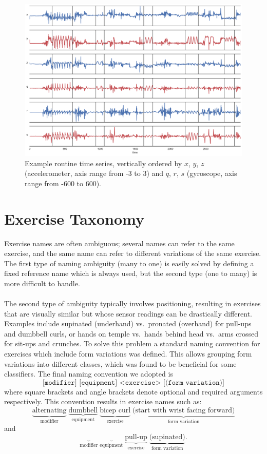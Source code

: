 \documentclass[12pt]{report}
\newcommand{\m}[1]{\texttt{#1}}
\newcommand{\1}[0]{\mathbbm{1}}
\begin{document}
\begin{figure}[ht!]
    \centering
    \includegraphics[width=1\textwidth]{img/routine_380.pdf}
    \caption[Example routine time series]{Example routine time series,
    vertically ordered by $x$, $y$, $z$ (accelerometer, axis range from -3 to 3)
    and $q$, $r$, $s$ (gyroscope, axis range from -600 to 600).}
    \label{fig:routine}
\end{figure}

\section{Exercise Taxonomy}
\label{sec:Exercise Taxonomy}
Exercise names are often ambiguous; several names can refer to the same exercise,
and the same name can refer to different variations of the same exercise.
The first type of naming ambiguity (many to one) is easily solved by defining a fixed reference name
which is always used, but the second type (one to many) is more difficult to handle.
\\\\
The second type of ambiguity typically involves positioning, resulting in exercises that are visually similar
but whose sensor readings can be drastically different.
Examples include supinated (underhand) vs.\ pronated (overhand) for pull-ups and dumbbell curls,
or hands on temple vs.\ hands behind head vs.\ arms crossed for sit-ups and crunches. To solve this problem
a standard naming convention for exercises which include form variations was defined. This allows grouping
form variations into different classes, which was found to be beneficial for some classifiers.
The final naming convention we adopted is
\[
    \m{[modifier] [equipment] <exercise> [(form variation)]}
\]
where square brackets and angle brackets denote optional and required arguments respectively.
This convention results in exercise names such as:
\[
    \underbrace{\text{alternating}}_{\text{modifier}} \; \underbrace{\text{dumbbell}}_{\text{equipment}} \; \underbrace{\text{bicep curl}}_{\text{exercise}} \; \underbrace{\text{(start with wrist facing forward)}}_{\text{form variation}}
\]
and
\[
    \underbrace{}_{\text{modifier}} \; \underbrace{}_{\text{equipment}} \; \underbrace{\text{pull-up}}_{\text{exercise}} \; \underbrace{\text{(supinated)}}_{\text{form variation}}.
\]
\end{document}
